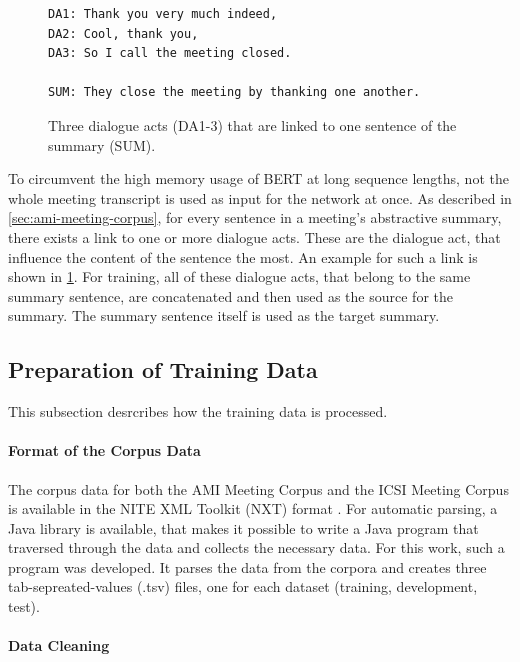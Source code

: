 \begin{figure}[h]
\begin{lstlisting}[numbers=none]
DA1: Thank you very much indeed,
DA2: Cool, thank you,
DA3: So I call the meeting closed.

SUM: They close the meeting by thanking one another.
\end{lstlisting}
\caption{Three dialogue acts (DA1-3) that are linked to one sentence of the summary (SUM).}
\label{fig:dialogue-arc-summary-link-example}
\end{figure}

To circumvent the high memory usage of BERT at long sequence lengths, not the whole meeting transcript is used as input for the network at once.
As described in \cref{sec:ami-meeting-corpus}, for every sentence in a meeting's abstractive summary, there exists a link to one or more dialogue acts.
These are the dialogue act, that influence the content of the sentence the most.
An example for such a link is shown in \cref{fig:dialogue-arc-summary-link-example}.
For training, all of these dialogue acts, that belong to the same summary sentence, are concatenated and then used as the source for the summary.
The summary sentence itself is used as the target summary.

\subsection{Preparation of Training Data}

This subsection desrcribes how the training data is processed.

\paragraph{Format of the Corpus Data}

The corpus data for both the AMI Meeting Corpus and the ICSI Meeting Corpus is available in the NITE XML Toolkit (NXT) format \cite{Carletta2003}.
For automatic parsing, a Java library is available, that makes it possible to write a Java program that traversed through the data and collects the necessary data.
For this work, such a program was developed.
It parses the data from the corpora and creates three tab-sepreated-values (.tsv) files, one for each dataset (training, development, test).

\paragraph{Data Cleaning}

